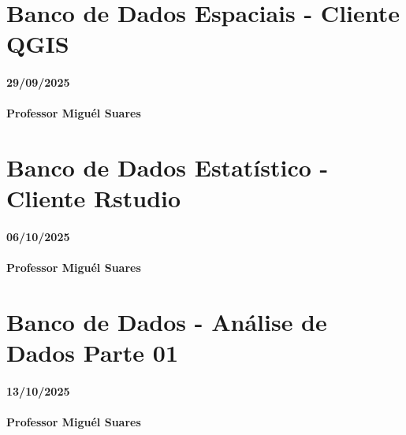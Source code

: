 \documentclass[
]{book}
\begin{document}
\chapter{Banco de Dados Espaciais - Cliente QGIS}\label{banco-de-dados-espaciais---cliente-qgis}

\subsubsection*{29/09/2025}\label{section-7}

\subsubsection*{Professor Miguél Suares}\label{professor-miguuxe9l-suares-7}

\chapter{Banco de Dados Estatístico - Cliente Rstudio}\label{banco-de-dados-estatuxedstico---cliente-rstudio}

\subsubsection*{06/10/2025}\label{section-8}

\subsubsection*{Professor Miguél Suares}\label{professor-miguuxe9l-suares-8}

\chapter{Banco de Dados - Análise de Dados Parte 01}\label{banco-de-dados---anuxe1lise-de-dados-parte-01}

\subsubsection*{13/10/2025}\label{section-9}

\subsubsection*{Professor Miguél Suares}\label{professor-miguuxe9l-suares-9}
\end{document}
